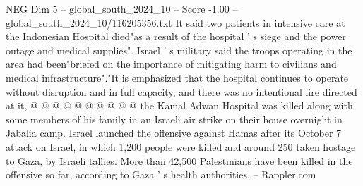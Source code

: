 \begin{textsample}{NEG Dim 5 – global\_south\_2024\_10 – Score -1.00 – global\_south\_2024\_10/116205356.txt}
It said two patients in intensive care at the Indonesian Hospital died"as a result of the hospital ' s siege and the power outage and medical supplies".
Israel ' s military said the troops operating in the area had been"briefed on the importance of mitigating harm to civilians and medical infrastructure"."It is emphasized that the hospital continues to operate without disruption and in full capacity, and there was no intentional fire directed at it, @ @ @ @ @ @ @ @ @ @ the Kamal Adwan Hospital was killed along with some members of his family in an Israeli air strike on their house overnight in Jabalia camp.
Israel launched the offensive against Hamas after its October 7 attack on Israel, in which 1,200 people were killed and around 250 taken hostage to Gaza, by Israeli tallies.
More than 42,500 Palestinians have been killed in the offensive so far, according to Gaza ' s health authorities. -- Rappler.com

\end{textsample}
